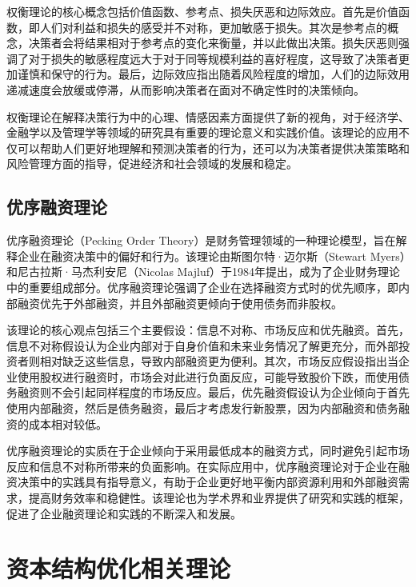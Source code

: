权衡理论的核心概念包括价值函数、参考点、损失厌恶和边际效应。首先是价值函数，即人们对利益和损失的感受并不对称，更加敏感于损失。其次是参考点的概念，决策者会将结果相对于参考点的变化来衡量，并以此做出决策。损失厌恶则强调了对于损失的敏感程度远大于对于同等规模利益的喜好程度，这导致了决策者更加谨慎和保守的行为。最后，边际效应指出随着风险程度的增加，人们的边际效用递减速度会放缓或停滞，从而影响决策者在面对不确定性时的决策倾向。

权衡理论在解释决策行为中的心理、情感因素方面提供了新的视角，对于经济学、金融学以及管理学等领域的研究具有重要的理论意义和实践价值。该理论的应用不仅可以帮助人们更好地理解和预测决策者的行为，还可以为决策者提供决策策略和风险管理方面的指导，促进经济和社会领域的发展和稳定。
\subsection{优序融资理论}
优序融资理论（Pecking Order Theory）是财务管理领域的一种理论模型，旨在解释企业在融资决策中的偏好和行为。该理论由斯图尔特·迈尔斯（Stewart Myers）和尼古拉斯·马杰利安尼（Nicolas Majluf）于1984年提出，成为了企业财务理论中的重要组成部分。优序融资理论强调了企业在选择融资方式时的优先顺序，即内部融资优先于外部融资，并且外部融资更倾向于使用债务而非股权。

该理论的核心观点包括三个主要假设：信息不对称、市场反应和优先融资。首先，信息不对称假设认为企业内部对于自身价值和未来业务情况了解更充分，而外部投资者则相对缺乏这些信息，导致内部融资更为便利。其次，市场反应假设指出当企业使用股权进行融资时，市场会对此进行负面反应，可能导致股价下跌，而使用债务融资则不会引起同样程度的市场反应。最后，优先融资假设认为企业倾向于首先使用内部融资，然后是债务融资，最后才考虑发行新股票，因为内部融资和债务融资的成本相对较低。

优序融资理论的实质在于企业倾向于采用最低成本的融资方式，同时避免引起市场反应和信息不对称所带来的负面影响。在实际应用中，优序融资理论对于企业在融资决策中的实践具有指导意义，有助于企业更好地平衡内部资源利用和外部融资需求，提高财务效率和稳健性。该理论也为学术界和业界提供了研究和实践的框架，促进了企业融资理论和实践的不断深入和发展。
\section{资本结构优化相关理论}
